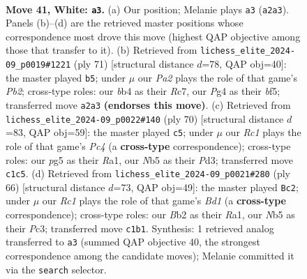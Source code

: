 \documentclass[11pt]{article}
\begin{document}
\clearpage

\begin{figure}[p]\centering
\begin{subfigure}{0.46\textwidth}\centering
\resizebox{\linewidth}{!}{%
\newchessgame
\chessboard[
  setfen={1nb5/1p6/1nr3k1/pN1p1pp1/1b4Pp/1P2P2P/PB2PK2/2RB4 w - - 0 41},
  showmover=false,
  pgfstyle=straightmove, color=movearrow, markmove={a2-a3}
]}
\caption{}
\end{subfigure}\hfill
\begin{subfigure}{0.46\textwidth}\centering
\resizebox{\linewidth}{!}{%
\newchessgame
\chessboard[
  setfen={6r1/1pr2b2/p2p1p1k/5B1p/1PPnP3/3P1p1N/3R3P/6RK b - - 4 36},
  showmover=false,
  pgfstyle=straightmove, color=movearrow, markmove={b7-b5}
]}
\caption{}
\end{subfigure}
\\[4pt]
\begin{subfigure}{0.46\textwidth}\centering
\resizebox{\linewidth}{!}{%
\newchessgame
\chessboard[
  setfen={1r2n3/3R1p2/1rp2kb1/p2p3p/P1PN2p1/3P2P1/5P1P/R4BK1 w - - 1 36},
  showmover=false,
  pgfstyle=straightmove, color=movearrow, markmove={c4-c5}
]}
\caption{}
\end{subfigure}\hfill
\begin{subfigure}{0.46\textwidth}\centering
\resizebox{\linewidth}{!}{%
\newchessgame
\chessboard[
  setfen={3r2b1/1pk1p1bp/p1n2pp1/6P1/4PP1P/2P1BN2/1P3K2/R2B4 w - - 5 34},
  showmover=false,
  pgfstyle=straightmove, color=movearrow, markmove={d1-c2}
]}
\caption{}
\end{subfigure}
\caption{\textbf{Move 41, White: \texttt{a3}.} (a) Our position; Melanie plays \texttt{a3} (\texttt{a2a3}). Panels (b)--(d) are the retrieved master positions whose correspondence most drove this move (highest QAP objective among those that transfer to it). (b) Retrieved from \texttt{lichess\_elite\_2024-09\_p0019\#1221} (ply 71) [structural distance $d$=78, QAP obj=40]: the master played \texttt{b5}; under $\mu$ our \emph{Pa2} plays the role of that game's \emph{Pb2}; cross-type roles: our \emph{b}b4 as their \emph{R}c7, our \emph{P}g4 as their \emph{b}f5; transferred move \texttt{a2a3} \textbf{(endorses this move)}. (c) Retrieved from \texttt{lichess\_elite\_2024-09\_p0022\#140} (ply 70) [structural distance $d$=83, QAP obj=59]: the master played \texttt{c5}; under $\mu$ our \emph{Rc1} plays the role of that game's \emph{Pc4} (a \textbf{cross-type} correspondence); cross-type roles: our \emph{p}g5 as their \emph{R}a1, our \emph{N}b5 as their \emph{P}d3; transferred move \texttt{c1c5}. (d) Retrieved from \texttt{lichess\_elite\_2024-09\_p0021\#280} (ply 66) [structural distance $d$=73, QAP obj=49]: the master played \texttt{Bc2}; under $\mu$ our \emph{Rc1} plays the role of that game's \emph{Bd1} (a \textbf{cross-type} correspondence); cross-type roles: our \emph{B}b2 as their \emph{R}a1, our \emph{N}b5 as their \emph{P}c3; transferred move \texttt{c1b1}. Synthesis: 1 retrieved analog transferred to \texttt{a3} (summed QAP objective 40, the strongest correspondence among the candidate moves); Melanie committed it via the \texttt{search} selector.}
\label{fig:thought-m80}
\end{figure}
\end{document}
